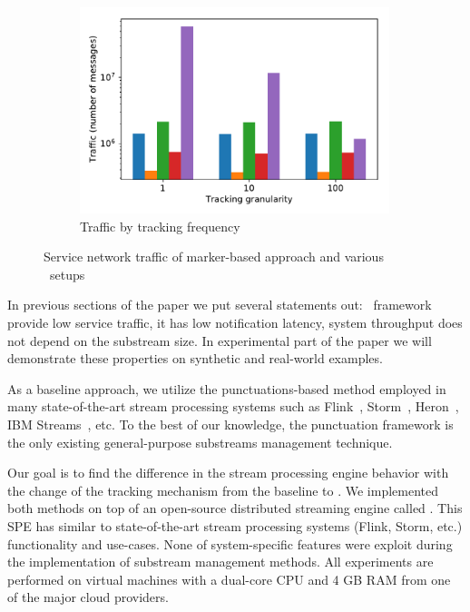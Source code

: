 \begin{figure}[t!]
\begin{subfigure}[b]{0.32\textwidth}
            \includegraphics[width=0.99\textwidth]{pics/traffic_by_tracking_frequency_bars.pdf}
            \caption{Traffic by tracking frequency}
            \label{traffic_granularity}
    \end{subfigure}
    \caption{Service network traffic of marker-based approach and various \tracker\ setups}
    \label{traffic_plots}
\end{figure}
In previous sections of the paper we put several statements out: \tracker\ framework provide low service traffic, it has low notification latency, system throughput does not depend on the substream size. In experimental part of the paper we will demonstrate these properties on synthetic and real-world examples. 

As a baseline approach, we utilize the punctuations-based method employed in many state-of-the-art stream processing systems such as Flink~\cite{Carbone:2017:SMA:3137765.3137777}, Storm~\cite{apache:storm:state}, Heron~\cite{Kulkarni:2015:THS:2723372.2742788}, IBM Streams~\cite{jacques2016consistent}, etc. To the best of our knowledge, the punctuation framework is the only existing general-purpose substreams management technique.

Our goal is to find the difference in the stream processing engine behavior with the change of the tracking mechanism from the baseline to \tracker. We implemented both methods on top of an open-source distributed streaming engine called \FlameStream. This SPE has similar to state-of-the-art stream processing systems (Flink, Storm, etc.) functionality and use-cases. None of system-specific features were exploit during the implementation of substream management methods. All experiments are performed on virtual machines with a dual-core CPU and 4 GB RAM from one of the major cloud providers. 

